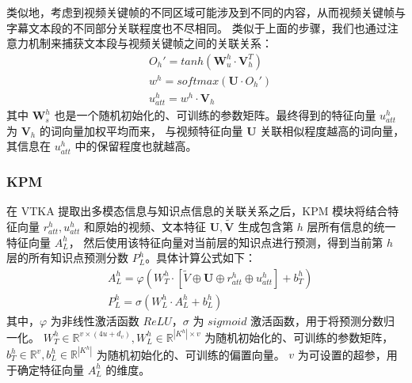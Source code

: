     类似地，考虑到视频关键帧的不同区域可能涉及到不同的内容，从而视频关键帧与字幕文本段的不同部分关联程度也不尽相同。
    类似于上面的步骤，我们也通过注意力机制来捕获文本段与视频关键帧之间的关联关系：
    \begin{equation}
        \begin{aligned}
            &O_h' = tanh(\boldsymbol{W}_u^h \cdot \boldsymbol{V}_h^T) \\
            &w^h = softmax(\boldsymbol{U} \cdot O_h') \\
            &u_{att}^h = w^h \cdot \boldsymbol{V}_h
        \end{aligned}
    \end{equation}
    其中 $\boldsymbol{W}_s^h$ 也是一个随机初始化的、可训练的参数矩阵。最终得到的特征向量 $u_{att}^h$ 为 $\boldsymbol{V}_h$ 的词向量加权平均而来，
    与视频特征向量 $\boldsymbol{U}$ 关联相似程度越高的词向量，其信息在 $u_{att}^h$ 中的保留程度也就越高。

    \subsubsection{KPM}
    在 VTKA 提取出多模态信息与知识点信息的关联关系之后，KPM 模块将结合特征向量 $r_{att}^h, u_{att}^h$ 和原始的视频、文本特征 $\boldsymbol{U}, \boldsymbol{\tilde{V}}$ 生成包含第 $h$ 层所有信息的统一特征向量 $A_L^h$，
    然后使用该特征向量对当前层的知识点进行预测，得到当前第 $h$ 层的所有知识点预测分数 $P_L^h$。具体计算公式如下：
    \begin{equation}
        \begin{aligned}
        &A_L^h = \varphi\left(W_T^h \cdot \left[\tilde{V} \oplus \boldsymbol{U} \oplus r_{att}^h \oplus u_{att}^h\right] + b_T^h\right) \\
        &P_L^h = \sigma\left(W_L^h \cdot A_L^h + b_L^h\right)
        \end{aligned}
    \end{equation}
    其中，$\varphi$ 为非线性激活函数 $ReLU$，$\sigma$ 为 $sigmoid$ 激活函数，用于将预测分数归一化。
    $W_T^h \in \mathbb{R}^{v \times (4u + d_v)}, W_L^h \in \mathbb{R}^{{\left|K^h\right|} \times v}$ 为随机初始化的、可训练的参数矩阵，
    $b_T^h \in \mathbb{R}^{v}, b_L^h \in \mathbb{R}^{\left|K^h\right|}$ 为随机初始化的、可训练的偏置向量。
    $v$ 为可设置的超参，用于确定特征向量 $A_L^h$ 的维度。

